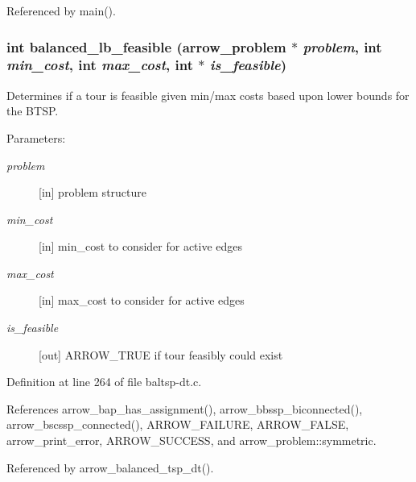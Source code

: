 Referenced by main().\hypertarget{lib_2baltsp_2baltsp-dt_8c_9428697bd562becac6ddd6fa733bbe81}{
\subsubsection[{balanced\_\-lb\_\-feasible}]{\setlength{\rightskip}{0pt plus 5cm}int balanced\_\-lb\_\-feasible ({\bf arrow\_\-problem} $\ast$ {\em problem}, \/  int {\em min\_\-cost}, \/  int {\em max\_\-cost}, \/  int $\ast$ {\em is\_\-feasible})}}
\label{lib_2baltsp_2baltsp-dt_8c_9428697bd562becac6ddd6fa733bbe81}


Determines if a tour is feasible given min/max costs based upon lower bounds for the BTSP. 

\begin{Desc}
\item[Parameters:]
\begin{description}
\item[{\em problem}]\mbox{[}in\mbox{]} problem structure \item[{\em min\_\-cost}]\mbox{[}in\mbox{]} min\_\-cost to consider for active edges \item[{\em max\_\-cost}]\mbox{[}in\mbox{]} max\_\-cost to consider for active edges \item[{\em is\_\-feasible}]\mbox{[}out\mbox{]} ARROW\_\-TRUE if tour feasibly could exist \end{description}
\end{Desc}


Definition at line 264 of file baltsp-dt.c.

References arrow\_\-bap\_\-has\_\-assignment(), arrow\_\-bbssp\_\-biconnected(), arrow\_\-bscssp\_\-connected(), ARROW\_\-FAILURE, ARROW\_\-FALSE, arrow\_\-print\_\-error, ARROW\_\-SUCCESS, and arrow\_\-problem::symmetric.

Referenced by arrow\_\-balanced\_\-tsp\_\-dt().
